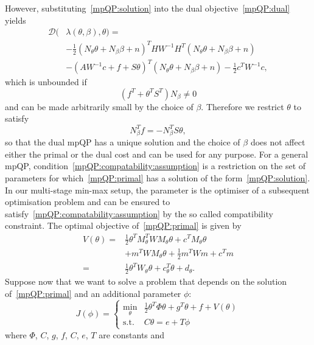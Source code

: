 \documentclass{ifacconf}
\begin{document}
However, substituting~\eqref{mpQP:solution} into the dual objective~\eqref{mpQP:dual} yields
\begin{align*}
\mathcal D(&\lambda(\theta,\beta),\theta) = \\
& {-\tfrac{1}{2}}(N_\theta \theta + N_\beta \beta + n)^T H W^{-1}H^T 
	(N_\theta \theta + N_\beta \beta + n)\\
& -(AW^{-1}c + 
	f + S\theta)^T(N_\theta \theta + N_\beta \beta + n) -\tfrac{1}{2}c^TW^{-1}c,
\end{align*}
which is unbounded if
\[
	(f^T+\theta^TS^T)N_\beta \neq 0
\]
and can be made arbitrarily small by the choice of $\beta$. Therefore we restrict $\theta$ to satisfy 
\begin{equation}\label{mpQP:compatability:assumption}
	N_\beta^Tf = -N_\beta^TS\theta,
\end{equation} 
so that the dual mpQP has a unique solution
and the choice of $\beta$ does not affect either the primal or the dual cost and can be used for
any purpose. For a general mpQP, condition~\eqref{mpQP:compatability:assumption} is a restriction on the set
of parameters for which~\eqref{mpQP:primal} has a solution of the form~\eqref{mpQP:solution}.
In our multi-stage min-max setup, the parameter is the optimiser of a subsequent optimisation
problem and can be ensured to satisfy~\eqref{mpQP:compatability:assumption} by the so called 
compatibility constraint. The optimal objective of~\eqref{mpQP:primal} is given by
\begin{equation}\label{mpQP:cost:to:go}\begin{split}
	V(\theta) = &\frac{1}{2}\theta^T M_\theta^T W M_\theta \theta + c^TM_\theta \theta \\
& + m^TWM_\theta \theta+\frac{1}{2}m^T Wm + c^Tm\\
=&\frac{1}{2} \theta^T W_\theta \theta + c^T_\theta \theta + d_\theta.
\end{split}\end{equation}
%
Suppose now that we want to solve a problem that depends on the solution of~\eqref{mpQP:primal} and an
additional parameter $\phi$:
\begin{equation}\label{mpQP:second:stage} 
	J(\phi) = \left\{\begin{array}{rl}
	\min_\theta & \frac{1}{2}\theta^T\Phi\theta + g^T\theta + f + V(\theta)\\
	\text{s.t.} & C\theta = e+T\phi
	\end{array}\right.
\end{equation}
where $\Phi$, $C$, $g$, $f$, $C$, $e$, $T$ are constants and
\end{document}
